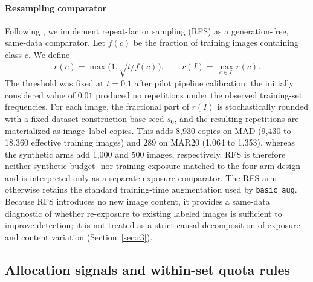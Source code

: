 \documentclass[preprint,12pt,authoryear]{elsarticle}
\begin{document}
\paragraph{Resampling comparator}
Following \citet{gupta2019lvis}, we implement repeat-factor sampling
(RFS) as a generation-free, same-data comparator. Let $f(c)$ be the
fraction of training images containing class $c$. We define
\[
r(c)=\max\!\bigl(1,\sqrt{t/f(c)}\bigr),
\qquad
r(I)=\max_{c\in I}r(c).
\]
The threshold was fixed at $t=0.1$ after pilot pipeline calibration;
the initially considered value of $0.01$ produced no repetitions under
the observed training-set frequencies. For each image, the fractional
part of $r(I)$ is stochastically rounded with a fixed
dataset-construction base seed $s_0$, and the resulting repetitions are
materialized as image--label copies. This adds 8{,}930 copies on MAD (9{,}430 to 18{,}360 effective
training images) and 289 on MAR20 (1{,}064 to 1{,}353), whereas the
synthetic arms add 1{,}000 and 500 images, respectively. RFS is therefore
neither synthetic-budget- nor training-exposure-matched to the four-arm
design and is interpreted only as a separate exposure comparator. The
RFS arm otherwise retains the standard training-time augmentation used
by \texttt{basic\_aug}.
Because RFS introduces no new image content, it provides a same-data
diagnostic of whether re-exposure to existing labeled images is
sufficient to improve detection; it is not treated as a strict causal
decomposition of exposure and content variation
(Section~\ref{sec:r3}).

\subsection{Allocation signals and within-set quota rules}\label{sec:alloc}
\end{document}
